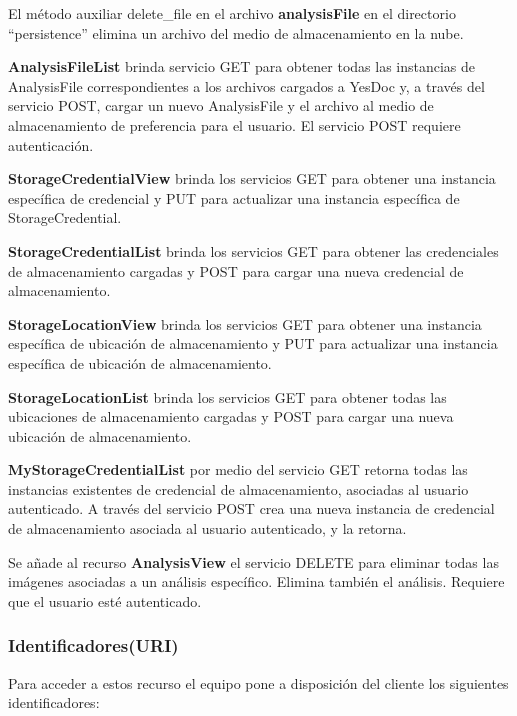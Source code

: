 El método auxiliar delete\_file en el archivo \textbf{analysisFile} en el directorio ``persistence'' elimina un archivo del medio de almacenamiento en la nube.

\textbf{AnalysisFileList} brinda servicio GET para obtener todas las instancias de AnalysisFile correspondientes a los archivos cargados a YesDoc y, a través del servicio POST, cargar un nuevo AnalysisFile y el archivo al medio de almacenamiento de preferencia para el usuario. El servicio POST requiere autenticación.

\textbf{StorageCredentialView} brinda los servicios GET para obtener una instancia específica de credencial y PUT para actualizar una instancia específica de StorageCredential.

\textbf{StorageCredentialList} brinda los servicios GET para obtener las credenciales de almacenamiento cargadas y POST para cargar una nueva credencial de almacenamiento.

\textbf{StorageLocationView} brinda los servicios GET para obtener una instancia específica de ubicación de almacenamiento y PUT para actualizar una instancia específica de ubicación de almacenamiento.	

\textbf{StorageLocationList} brinda los servicios GET para obtener todas las ubicaciones de almacenamiento cargadas y POST para cargar una nueva ubicación de almacenamiento.

\textbf{MyStorageCredentialList} por medio del servicio GET retorna todas las instancias existentes de credencial de almacenamiento, asociadas al usuario autenticado. A través del servicio POST crea una nueva instancia de credencial de almacenamiento asociada al usuario autenticado, y la retorna.

Se añade al recurso \textbf{AnalysisView} el servicio DELETE para eliminar todas las imágenes asociadas a un análisis específico. Elimina también el análisis. Requiere que el usuario esté autenticado.

\subsubsection{Identificadores(URI)}
Para acceder a estos recurso el equipo pone a disposición del cliente los siguientes identificadores:

